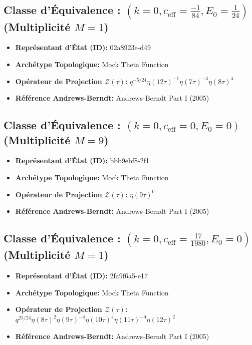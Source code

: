 \documentclass[11pt,twoside,openright]{book}
\begin{document}
\subsection*{Classe d'Équivalence : $(k=0, c_{\text{eff}}=\frac{-1}{84}, E_0=\frac{1}{24})$ (Multiplicité $M=1$)}
\begin{itemize}
  \item \textbf{Représentant d'État (ID):} 02a8923e-d49
  \item \textbf{Archétype Topologique:} Mock Theta Function
  \item \textbf{Opérateur de Projection $\mathcal{Z}(\tau)$:} $q^{-5/24} \eta(12\tau)^{-1} \eta(7\tau)^{-3} \eta(8\tau)^{4}$
  \item \textbf{Référence Andrews-Berndt:} Andrews-Berndt Part I (2005)
\end{itemize}

\subsection*{Classe d'Équivalence : $(k=0, c_{\text{eff}}=0, E_0=0)$ (Multiplicité $M=9$)}
\begin{itemize}
  \item \textbf{Représentant d'État (ID):} bbb9ebf8-2f1
  \item \textbf{Archétype Topologique:} Mock Theta Function
  \item \textbf{Opérateur de Projection $\mathcal{Z}(\tau)$:} $\eta(9\tau)^{0}$
  \item \textbf{Référence Andrews-Berndt:} Andrews-Berndt Part I (2005)
\end{itemize}

\subsection*{Classe d'Équivalence : $(k=0, c_{\text{eff}}=\frac{17}{1980}, E_0=0)$ (Multiplicité $M=1$)}
\begin{itemize}
  \item \textbf{Représentant d'État (ID):} 2fa9f6a5-e17
  \item \textbf{Archétype Topologique:} Mock Theta Function
  \item \textbf{Opérateur de Projection $\mathcal{Z}(\tau)$:} $q^{25/24} \eta(8\tau)^{2} \eta(9\tau)^{-4} \eta(10\tau)^{4} \eta(11\tau)^{-4} \eta(12\tau)^{2}$
  \item \textbf{Référence Andrews-Berndt:} Andrews-Berndt Part I (2005)
\end{itemize}
\end{document}
